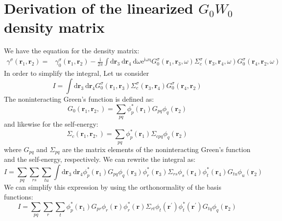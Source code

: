 \documentclass[12pt]{caltech_thesis}
\begin{document}
\chapter{Derivation of the linearized $G_0W_0$ density matrix}
We have the equation for the density matrix:
\begin{equation}
\begin{aligned}
\gamma^\sigma\left(\mathbf{r}_1, \mathbf{r}_2\right)= & \gamma_0^\sigma\left(\mathbf{r}_1, \mathbf{r}_2\right) -\frac{\mathrm{i}}{2 \pi} \int \mathrm{d} \mathbf{r}_3 \mathrm{~d} \mathbf{r}_4 \mathrm{~d} \omega \mathrm{e}^{\mathrm{i \omega \eta}} G_0^\sigma\left(\mathbf{r}_1, \mathbf{r}_3, \omega\right) \Sigma_c^\sigma\left(\mathbf{r}_3, \mathbf{r}_4, \omega\right) G_0^\sigma\left(\mathbf{r}_4, \mathbf{r}_2, \omega\right)
\label{eqn:init_dm}
\end{aligned}
\end{equation}
In order to simplify the integral, Let us consider
\begin{equation}
I = \int \mathrm{d} \mathbf{r}_3 \mathrm{~d} \mathbf{r}_4  G_0^\sigma\left(\mathbf{r}_1, \mathbf{r}_3\right) \Sigma_c^\sigma\left(\mathbf{r}_3, \mathbf{r}_4\right) G_0^\sigma\left(\mathbf{r}_4, \mathbf{r}_2\right)
\end{equation}
The noninteracting Green's function is defined as:
\begin{equation}
G_0\left(\mathbf{r}_1, \mathbf{r}_2, \right) = \sum_{pq} \phi_p^*(\mathbf{r}_1) G_{p q} \phi_q(\mathbf{r}_2)
\end{equation}
and likewise for the self-energy:
\begin{equation}
\Sigma_c\left(\mathbf{r}_1, \mathbf{r}_2, \right) = \sum_{pq} \phi_p^*(\mathbf{r}_1) \Sigma_{c pq} \phi_q(\mathbf{r}_2)
\end{equation}
where $G_{p q}$ and $\Sigma_{p q}$ are the matrix elements of the noninteracting Green's function and the self-energy, respectively. We can rewrite the integral as:
\begin{equation}
I = \sum_{pq} \sum_{rs} \sum_{tu} \int \mathrm{d} \mathbf{r}_3 \mathrm{~d} \mathbf{r}_4 \phi_p^*(\mathbf{r}_1) G_{p q} \phi_q(\mathbf{r}_3) \phi_r^*(\mathbf{r}_3) \Sigma_{r s} \phi_s(\mathbf{r}_4) \phi_t^*(\mathbf{r}_4) G_{t u} \phi_u(\mathbf{r}_2)
\end{equation}
We can simplify this expression by using the orthonormality of the basis functions:
\begin{equation}
I = \sum_{pq} \sum_{r} \sum_{t} \phi_p^*(\mathbf{r}_1) G_{p r} \phi_r(\mathbf{r}) \phi_r^*(\mathbf{r}) \Sigma_{r t} \phi_t(\mathbf{r}^\prime) \phi_t^*(\mathbf{r}^\prime) G_{t q} \phi_q(\mathbf{r}_2)
\end{equation}
\end{document}
